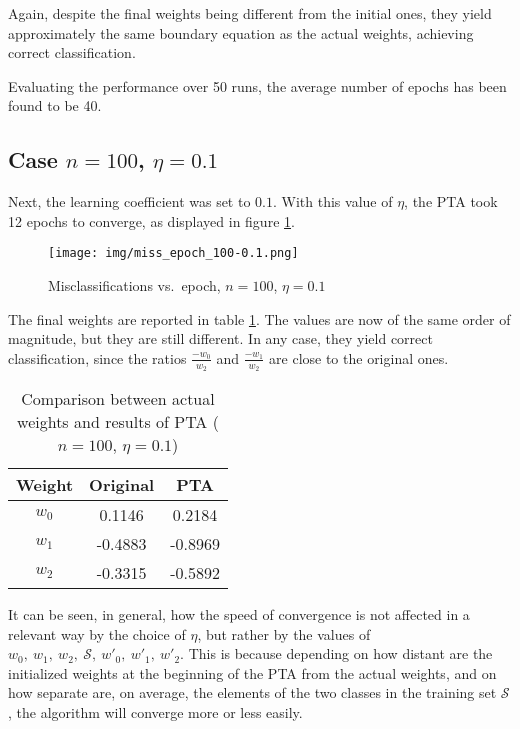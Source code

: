 \documentclass[12pt]{article}
\begin{document}
Again, despite the final weights being different from the initial ones, they yield approximately the same boundary equation as the actual weights, achieving correct classification.

Evaluating the performance over 50 runs, the average number of epochs has been found to be 40.

\subsection{Case $n=100$, $\eta=0.1$}
\label{sec:100-01}

Next, the learning coefficient was set to $0.1$.
With this value of $\eta$, the PTA took 12 epochs to converge, as displayed in figure \ref{fig:100-01-1}.

\begin{figure}[h]
    \centering
    \texttt{[image: img/miss\_epoch\_100-0.1.png]}
    \caption{Misclassifications vs.\ epoch, $n=100$, $\eta=0.1$}
    \label{fig:100-01-1}
\end{figure}

The final weights are reported in table \ref{tab:03}.
The values are now of the same order of magnitude, but they are still different.
In any case, they yield correct classification, since the ratios $\frac{-w_0}{w_2}$ and $\frac{-w_1}{w_2}$ are close to the original ones.

\begin{table}[h]
    \centering
    \begin{tabular}{|c|c|c|}
        \hline
        Weight & \textbf{Original} & \textbf{PTA} \\ 
        \hline
        \hline
        $w_0$ & 0.1146 & 0.2184 \\
        \hline
        $w_1$ & -0.4883 & -0.8969 \\
        \hline
        $w_2$ & -0.3315 & -0.5892 \\
        \hline
    \end{tabular}
    \caption{Comparison between actual weights and results of PTA ($n=100$, $\eta=0.1$)}
    \label{tab:03}
\end{table}

It can be seen, in general, how the speed of convergence is not affected in a relevant way by the choice of $\eta$, but rather by the values of $w_0,\ w_1,\ w_2,\ \mathcal{S},\ w'_0,\ w'_1,\ w'_2$.
This is because depending on how distant are the initialized weights at the beginning of the PTA from the actual weights, and on how separate are, on average, the elements of the two classes in the training set $\mathcal{S}$, the algorithm will converge more or less easily.
\end{document}
